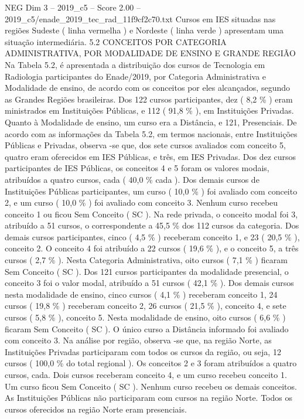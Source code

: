 \begin{textsample}{NEG Dim 3 – 2019\_c5 – Score 2.00 – 2019\_c5/enade\_2019\_tec\_rad\_11f9cf2c70.txt}
Cursos em IES situadas nas regiões Sudeste ( linha vermelha ) e Nordeste ( linha verde ) apresentam uma situação intermediária. 5.2 CONCEITOS POR CATEGORIA ADMINISTRATIVA, POR MODALIDADE DE ENSINO E GRANDE REGIÃO Na Tabela 5.2, é apresentada a distribuição dos cursos de Tecnologia em Radiologia participantes do Enade/2019, por Categoria Administrativa e Modalidade de ensino, de acordo com os conceitos por eles alcançados, segundo as Grandes Regiões brasileiras.
Dos 122 cursos participantes, dez ( 8,2 \% ) eram ministrados em Instituições Públicas, e 112 ( 91,8 \% ), em Instituições Privadas.
Quanto à Modalidade de ensino, um curso era a Distância, e 121, Presenciais.
De acordo com as informações da Tabela 5.2, em termos nacionais, entre Instituições Públicas e Privadas, observa -se que, dos sete cursos avaliados com conceito 5, quatro eram oferecidos em IES Públicas, e três, em IES Privadas.
Dos dez cursos participantes de IES Públicas, os conceitos 4 e 5 foram os valores modais, atribuídos a quatro cursos, cada ( 40,0 \% cada ).
Dos demais cursos de Instituições Públicas participantes, um curso ( 10,0 \% ) foi avaliado com conceito 2, e um curso ( 10,0 \% ) foi avaliado com conceito 3.
Nenhum curso recebeu conceito 1 ou ficou Sem Conceito ( SC ).
Na rede privada, o conceito modal foi 3, atribuído a 51 cursos, o correspondente a 45,5 \% dos 112 cursos da categoria.
Dos demais cursos participantes, cinco ( 4,5 \% ) receberam conceito 1, e 23 ( 20,5 \% ), conceito 2.
O conceito 4 foi atribuído a 22 cursos ( 19,6 \% ), e o conceito 5, a três cursos ( 2,7 \% ).
Nesta Categoria Administrativa, oito cursos ( 7,1 \% ) ficaram Sem Conceito ( SC ).
Dos 121 cursos participantes da modalidade presencial, o conceito 3 foi o valor modal, atribuído a 51 cursos ( 42,1 \% ).
Dos demais cursos nesta modalidade de ensino, cinco cursos ( 4,1 \% ) receberam conceito 1, 24 cursos ( 19,8 \% ) receberam conceito 2, 26 cursos ( 21,5 \% ), conceito 4, e sete cursos ( 5,8 \% ), conceito 5.
Nesta modalidade de ensino, oito cursos ( 6,6 \% ) ficaram Sem Conceito ( SC ).
O único curso a Distância informado foi avaliado com conceito 3.
Na análise por região, observa -se que, na região Norte, as Instituições Privadas participaram com todos os cursos da região, ou seja, 12 cursos ( 100,0 \% do total regional ).
Os conceitos 2 e 3 foram atribuídos a quatro cursos, cada.
Dois cursos receberam conceito 4, e um curso recebeu conceito 1.
Um curso ficou Sem Conceito ( SC ).
Nenhum curso recebeu os demais conceitos.
As Instituições Públicas não participaram com cursos na região Norte.
Todos os cursos oferecidos na região Norte eram presenciais.

\end{textsample}
